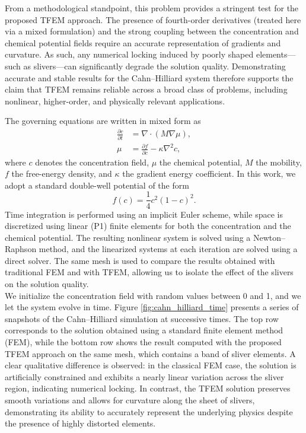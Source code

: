 \documentclass{article}
\begin{document}
From a methodological standpoint, this problem provides a stringent test for the proposed TFEM approach. The presence of fourth-order derivatives (treated here via a mixed formulation) and the strong coupling between the concentration and chemical potential fields require an accurate representation of gradients and curvature. As such, any numerical locking induced by poorly shaped elements—such as slivers—can significantly degrade the solution quality. Demonstrating accurate and stable results for the Cahn–Hilliard system therefore supports the claim that TFEM remains reliable across a broad class of problems, including nonlinear, higher-order, and physically relevant applications.

The governing equations are written in mixed form as
\begin{align}
\frac{\partial c}{\partial t} &= \nabla \cdot (M \nabla \mu), \\
\mu &= \frac{\partial f}{\partial c} - \kappa \nabla^2 c,
\end{align}
where $c$ denotes the concentration field, $\mu$ the chemical potential, $M$ the mobility, $f$ the free-energy density, and $\kappa$ the gradient energy coefficient. In this work, we adopt a standard double-well potential of the form
\begin{equation}
f(c) = \frac{1}{4} c^2 (1 - c)^2.
\end{equation}
Time integration is performed using an implicit Euler scheme, while space is discretized using linear (P1) finite elements for both the concentration and the chemical potential. The resulting nonlinear system is solved using a Newton–Raphson method, and the linearized systems at each iteration are solved using a direct solver. The same mesh is used to compare the results obtained with traditional FEM and with TFEM, allowing us to isolate the effect of the slivers on the solution quality.\\

We initialize the concentration field with random values between 0 and 1, and we let the system evolve in time. Figure \ref{fig:cahn_hilliard_time} presents a series of snapshots of the Cahn–Hilliard simulation at successive times. The top row corresponds to the solution obtained using a standard finite element method (FEM), while the bottom row shows the result computed with the proposed TFEM approach on the same mesh, which contains a band of sliver elements. A clear qualitative difference is observed: in the classical FEM case, the solution is artificially constrained and exhibits a nearly linear variation across the sliver region, indicating numerical locking. In contrast, the TFEM solution preserves smooth variations and allows for curvature along the sheet of slivers, demonstrating its ability to accurately represent the underlying physics despite the presence of highly distorted elements.
\end{document}

